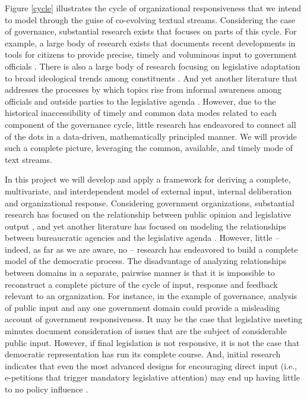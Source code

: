 Figure \ref{cycle} illustrates the cycle of organizational responsiveness that we intend to model through the guise of co-evolving textual streams. Considering the case of governance, substantial research exists that focuses on parts of this cycle. For example, a large body of research exists that documents recent developments in tools for citizens to provide precise, timely and voluminous input to government officials  \cite{Yildiz2007}. There is also a large body of research focusing on legislative adaptation to broad ideological trends among constituents \cite{Canes-Wrone2002}.  And yet another literature that addresses the processes by which topics rise from informal awareness among officials and outside parties to the legislative agenda \cite{Baumgartner1993}. However, due to the historical inaccessibility of timely and common data modes related to each component of the governance cycle, little research has endeavored to connect all of the dots in a data-driven, mathematically principled manner. We will provide such a complete picture, leveraging the common, available, and timely mode of text streams.


In this project we will develop and apply a framework for deriving a complete, multivariate, and interdependent model of external input, internal deliberation and organizational response. Considering government organizations, substantial research has focused on the relationship between public opinion and legislative output  \cite{Canes-Wrone2002,Levendusky2008}, and yet another literature has focused on modeling the relationships between bureaucratic agencies and the legislative agenda \cite{Wood1991,Furlong1998}. However, little -- indeed, as far as we are aware, no -- research has endeavored to build a complete model of the democratic process. The disadvantage of analyzing relationships between domains in a separate, pairwise manner is that it is impossible to reconstruct a complete picture of the cycle of input, response and feedback relevant to an organization.  For instance, in the example of governance, analysis of public input and any one government domain could provide a misleading account of government responsiveness. It may be the case that legislative meeting minutes document consideration of issues that are the subject of considerable public input. However, if final legislation is not responsive, it is not the case that democratic representation has run its complete course. And, initial research indicates that even the most advanced designs for encouraging direct input (i.e., e-petitions that trigger mandatory legislative attention) may end up having little to no policy influence \cite{Hough2012}.


